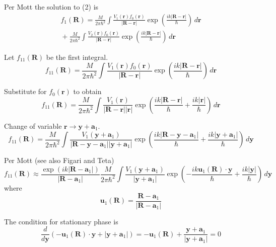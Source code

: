 \documentclass[12pt]{article}
\begin{document}
Per Mott the solution to (2) is
\begin{multline*}
f_1(\mathbf R)=
\frac{M}{2\pi\hbar^2}\int\frac{V_1(\mathbf r)f_0(\mathbf r)}{|\mathbf R-\mathbf r|}
\exp\left(\frac{ik|\mathbf R-\mathbf r|}{\hbar}\right)\,d\mathbf r
\\
{}+\frac{M}{2\pi\hbar^2}\int\frac{V_2(\mathbf r)f_0(\mathbf r)}{|\mathbf R-\mathbf r|}
\exp\left(\frac{ik|\mathbf R-\mathbf r|}{\hbar}\right)\,d\mathbf r
\end{multline*}

Let $f_{11}(\mathbf R)$ be the first integral.
\begin{equation*}
f_{11}(\mathbf R)=
\frac{M}{2\pi\hbar^2}\int\frac{V_1(\mathbf r)f_0(\mathbf r)}{|\mathbf R-\mathbf r|}
\exp\left(\frac{ik|\mathbf R-\mathbf r|}{\hbar}\right)\,d\mathbf r
\end{equation*}

Substitute for $f_0(\mathbf r)$ to obtain
\begin{equation*}
f_{11}(\mathbf R)=
\frac{M}{2\pi\hbar^2}\int\frac{V_1(\mathbf r)}{|\mathbf R-\mathbf r||\mathbf r|}
\exp\left(\frac{ik|\mathbf R-\mathbf r|}{\hbar}+\frac{ik|\mathbf r|}{\hbar}\right)\,d\mathbf r
\end{equation*}

Change of variable $\mathbf r\rightarrow\mathbf y+\mathbf a_1$.
\begin{equation*}
f_{11}(\mathbf R)=
\frac{M}{2\pi\hbar^2}\int
\frac{V_1(\mathbf y+\mathbf a_1)}{|\mathbf R-\mathbf y-\mathbf a_1||\mathbf y+\mathbf a_1|}
\exp\left(\frac{ik|\mathbf R-\mathbf y-\mathbf a_1|}{\hbar}
+\frac{ik|\mathbf y+\mathbf a_1|}{\hbar}\right)\,d\mathbf y
\end{equation*}

Per Mott (see also Figari and Teta)
\begin{equation*}
f_{11}(\mathbf R)\approx
\frac{\exp(ik|\mathbf R-\mathbf a_1|)}{|\mathbf R-\mathbf a_1|}
\frac{M}{2\pi\hbar^2}\int\frac{V_1(\mathbf y+\mathbf a_1)}{|\mathbf y+\mathbf a_1|}
\exp\left(-\frac{ik\mathbf u_1(\mathbf R)\cdot\mathbf y}{\hbar}
+\frac{ik|\mathbf y|}{\hbar}\right)
\,d\mathbf y
\tag{3}
\end{equation*}
where
\begin{equation*}
\mathbf u_1(\mathbf R)=\frac{\mathbf R-\mathbf a_1}{|\mathbf R-\mathbf a_1|}
\end{equation*}

The condition for stationary phase is
\begin{equation*}
\frac{d}{d\mathbf y}\left(-\mathbf u_1(\mathbf R)\cdot\mathbf y+|\mathbf y+\mathbf a_1|\right)
=-\mathbf u_1(\mathbf R)+\frac{\mathbf y+\mathbf a_1}{|\mathbf y+\mathbf a_1|}=0
\tag{4}
\end{equation*}
\end{document}
